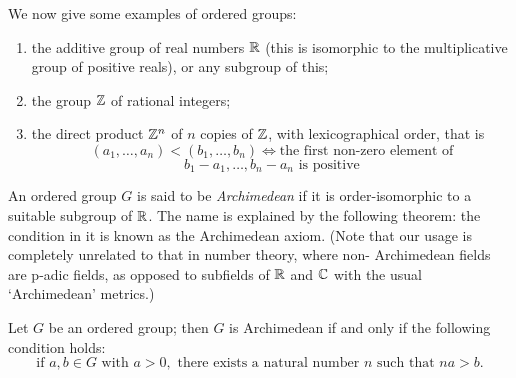 We now give some examples of ordered groups:
\begin{enumerate}[(1)]
  \item the additive group of real numbers $\mathbb{R}$ (this is isomorphic to the
        multiplicative group of positive reals), or any subgroup of this;
  \item the group $\mathbb{Z}$ of rational integers;
  \item the direct product $\mathbb{Z}^n$ of $n$ copies of $\mathbb{Z}$, with lexicographical order, that is
        \[
          (a_1, \ldots, a_n) < (b_1, \ldots, b_n) \iff \text{the first non-zero element of}
        \]
        \[
          b_1 - a_1, \ldots, b_n - a_n \text{ is positive}
        \]
\end{enumerate}

An ordered group $G$ is said to be \emph{Archimedean} if it is order-isomorphic to
a suitable subgroup of $\mathbb{R}$. The name is explained by the following theorem:
the condition in it is known as the Archimedean axiom. (Note that our
usage is completely unrelated to that in number theory, where non-
Archimedean fields are p-adic fields, as opposed to subfields of $\mathbb{R}$ and $\mathbb{C}$ with
the usual `Archimedean' metrics.)

\begin{theorem}\label{thm:10.6}
Let $G$ be an ordered group; then $G$ is Archimedean if and
only if the following condition holds:
\[
  \text{if } a, b \in G \text{ with } a > 0, \text{ there exists a natural number } n \text{ such that } na > b.
\]
\end{theorem}


